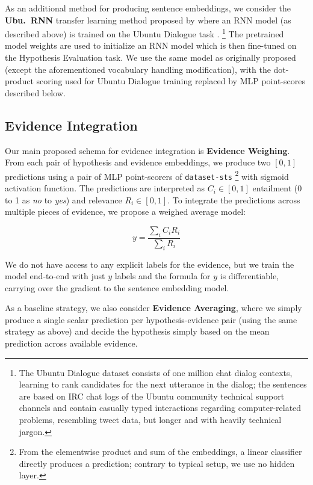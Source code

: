 \documentclass[11pt]{article}
\begin{document}
As an additional method for producing sentence embeddings, we consider
the \textbf{Ubu.\ RNN} transfer learning method proposed by \cite{sps} where an RNN model
(as described above) is trained on the Ubuntu Dialogue task \cite{UbuntuLowe}.%
\footnote{The Ubuntu Dialogue dataset consists of one million chat dialog contexts,
learning to rank candidates for the next utterance in the dialog;
the sentences are based on IRC chat logs of the Ubuntu
community technical support channels and contain casually typed interactions regarding
computer-related problems, resembling tweet data, but longer and with heavily technical jargon.}
The pretrained model weights are used to initialize an RNN model which is then fine-tuned
on the Hypothesis Evaluation task.  We use the same model as originally proposed (except the aforementioned vocabulary handling modification),
with the dot-product scoring used for Ubuntu Dialogue training replaced by MLP point-scores described below.

\subsection{Evidence Integration}

Our main proposed schema for evidence integration is \textbf{Evidence Weighing}.
From each pair of hypothesis and evidence embeddings, we produce two $[0,1]$
predictions using a pair of MLP point-scorers of \texttt{dataset-sts} \cite{sps}%
\footnote{From the elementwise product
and sum of the embeddings, a linear classifier directly produces a prediction;
contrary to typical setup, we use no hidden layer.}
with sigmoid activation function.  The predictions are interpreted as $C_i \in [0,1]$
entailment (0 to 1 as \textit{no} to \textit{yes}) and relevance $R_i \in [0,1]$.
To integrate the predictions across multiple pieces of evidence,
we propose a weighed average model:

$$ y  = \frac{\sum_i C_iR_i}{\sum_i R_i} $$

We do not have access to any explicit labels for the evidence,
but we train the model end-to-end with just $y$ labels and the formula
for $y$ is differentiable, carrying over the gradient to the sentence
embedding model.

As a baseline strategy, we also consider \textbf{Evidence Averaging}, where
we simply produce a single scalar prediction per hypothesis-evidence pair
(using the same strategy as above) and decide the hypothesis simply based
on the mean prediction across available evidence.
\end{document}
